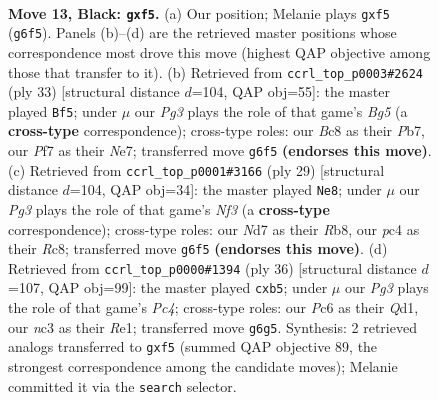 \documentclass[11pt]{article}
\begin{document}
\begin{figure}[p]
\label{fig:thought-m23}
\end{figure}

\clearpage

\begin{figure}[p]\centering
\begin{subfigure}{0.46\textwidth}\centering
\resizebox{\linewidth}{!}{%
\newchessgame
\chessboard[
  setfen={1rb1qrk1/pp1n1pb1/2pp1np1/5P1p/PPPNP2P/2N3P1/6B1/R1BQK2R b KQ - 0 13},
  showmover=false,
  pgfstyle=straightmove, color=movearrow, markmove={g6-f5}
]}
\caption{}
\end{subfigure}\hfill
\begin{subfigure}{0.46\textwidth}\centering
\resizebox{\linewidth}{!}{%
\newchessgame
\chessboard[
  setfen={1r3rk1/1p1qnpb1/2n3p1/pNp1p1Np/6bP/PQ1P1PP1/1P1BP1B1/1R2R1K1 b - - 0 17},
  showmover=false,
  pgfstyle=straightmove, color=movearrow, markmove={g4-f5}
]}
\caption{}
\end{subfigure}
\\[4pt]
\begin{subfigure}{0.46\textwidth}\centering
\resizebox{\linewidth}{!}{%
\newchessgame
\chessboard[
  setfen={1rr3k1/2qbbppp/p1nppn2/1p4P1/4PP2/PNN1BB2/1PP4P/R2Q1R1K b - - 0 15},
  showmover=false,
  pgfstyle=straightmove, color=movearrow, markmove={f6-e8}
]}
\caption{}
\end{subfigure}\hfill
\begin{subfigure}{0.46\textwidth}\centering
\resizebox{\linewidth}{!}{%
\newchessgame
\chessboard[
  setfen={1r1qrbk1/1bpn1p2/p2p2pp/1p2p3/1PPPPn2/P4N1P/1BBN1PP1/1R1QR1K1 w - - 1 19},
  showmover=false,
  pgfstyle=straightmove, color=movearrow, markmove={c4-b5}
]}
\caption{}
\end{subfigure}
\caption{\textbf{Move 13, Black: \texttt{gxf5}.} (a) Our position; Melanie plays \texttt{gxf5} (\texttt{g6f5}). Panels (b)--(d) are the retrieved master positions whose correspondence most drove this move (highest QAP objective among those that transfer to it). (b) Retrieved from \texttt{ccrl\_top\_p0003\#2624} (ply 33) [structural distance $d$=104, QAP obj=55]: the master played \texttt{Bf5}; under $\mu$ our \emph{Pg3} plays the role of that game's \emph{Bg5} (a \textbf{cross-type} correspondence); cross-type roles: our \emph{B}c8 as their \emph{P}b7, our \emph{P}f7 as their \emph{N}e7; transferred move \texttt{g6f5} \textbf{(endorses this move)}. (c) Retrieved from \texttt{ccrl\_top\_p0001\#3166} (ply 29) [structural distance $d$=104, QAP obj=34]: the master played \texttt{Ne8}; under $\mu$ our \emph{Pg3} plays the role of that game's \emph{Nf3} (a \textbf{cross-type} correspondence); cross-type roles: our \emph{N}d7 as their \emph{R}b8, our \emph{p}c4 as their \emph{R}c8; transferred move \texttt{g6f5} \textbf{(endorses this move)}. (d) Retrieved from \texttt{ccrl\_top\_p0000\#1394} (ply 36) [structural distance $d$=107, QAP obj=99]: the master played \texttt{cxb5}; under $\mu$ our \emph{Pg3} plays the role of that game's \emph{Pc4}; cross-type roles: our \emph{P}c6 as their \emph{Q}d1, our \emph{n}c3 as their \emph{R}e1; transferred move \texttt{g6g5}. Synthesis: 2 retrieved analogs transferred to \texttt{gxf5} (summed QAP objective 89, the strongest correspondence among the candidate moves); Melanie committed it via the \texttt{search} selector.}

\end{figure}
\end{document}
